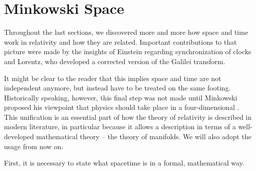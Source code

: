 	\section{Minkowski Space}
Throughout the last sections, we discovered more and more how space and time work in relativity and how they are related. Important contributions to that picture were made by the insights of Einstein regarding synchronization of clocks and Lorentz, who developed a corrected version of the Galilei transform.

It might be clear to the reader that this implies space and time are not independent anymore, but instead have to be treated on the same footing. Historically speaking, however, this final step was not made until Minkowski proposed his viewpoint that physics should take place in a four-dimensional . This unification is an essential part of how the theory of relativity is described in modern literature, in particular because it allows a description in terms of a well-developed mathematical theory -- the theory of manifolds. We will also adopt the usage from now on.








First, it is necessary to state what spacetime is in a formal, mathematical way.


